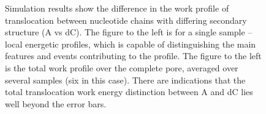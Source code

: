 \documentclass[a4paper,10pt]{article}
\begin{document}
\begin{figure}
\caption{Simulation results show the difference in the work profile of translocation between nucleotide
chains with differing secondary structure (A vs dC). The figure to the left is for a single sample -- local
energetic profiles, which is capable of distinguishing the main features and events contributing to the profile.
The figure to the left is the total work profile over the complete pore, averaged over several samples (six in 
this case). There are indications that the total translocation work energy distinction between A and dC lies 
well beyond the error bars.}
 \label{model}
\end{figure}
\end{document}
